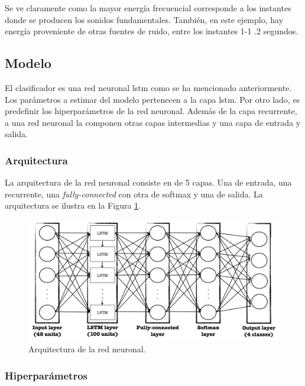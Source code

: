 \indent Se ve claramente como la mayor energía frecuencial corresponde a los instantes donde se producen los sonidos
fundamentales. También, en este ejemplo, hay energía proveniente de otras fuentes de ruido, entre los instantes 1-1
.2 segundos.

\subsection{Modelo} \label{subsec:model}

\indent El clasificador es una red neuronal \gls{lstm} como se ha mencionado anteriormente. Los parámetros a
estimar del modelo pertenecen a la capa \gls{lstm}. Por otro lado, es predefinir los hiperparámetros de la red
neuronal. Además de la capa recurrente, a una red neuronal la componen otras capas intermedias y una capa de entrada
y salida.

\subsubsection{Arquitectura}

\indent La arquitectura de la red neuronal consiste en de 5 capas. Una de entrada, una recurrente, una
\textit{fully-connected} con otra de softmax y una de salida. La arquitectura se ilustra en la Figura
\ref{fig:nn-architecture}.

\begin{figure}[H]
  \centering
  \includegraphics[scale=0.35]{sections/chapter-07/images/lstm-architecture.png}
  \caption[Arquitectura de la red neuronal]{Arquitectura de la red neuronal.}
  \label{fig:nn-architecture}
\end{figure}

\subsubsection{Hiperparámetros}

